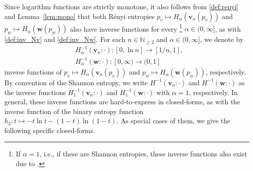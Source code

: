 \documentclass[conference, draftcls, onecolumn]{IEEEtran}
\theoremstyle{plain}
\newcommand{\bvec}[1]{\boldsymbol{#1}}
\newcommand{\lemref}[1]{Lemma~\ref{#1}}
\begin{document}
Since logarithm functions are strictly monotone, it also follows from \eqref{def:renyi} and \lemref{lem:mono} that both R\'{e}nyi entropies $p_{v} \mapsto H_{\alpha}( \bvec{v}_{n}( p_{v} ) )$ and $p_{w} \mapsto H_{\alpha}( \bvec{w}( p_{w} ) )$ also have inverse functions for every%
\footnote{If $\alpha = 1$, i.e., if these are Shannon entropies, these inverse functions also exist due to \cite[Lemma~1]{part1}.}
$\alpha \in (0, \infty]$,
as with \eqref{def:inv_Nv} and \eqref{def:inv_Nw}.
For each $n \in \mathbb{N}_{\ge 2}$ and $\alpha \in (0, \infty]$, we denote by
\begin{align}
&
H_{\alpha}^{-1}( \bvec{v}_{n} : \cdot ) : [0, \ln n] \to [1/n, 1] ,
\label{def:inv_Hv} \\
&
H_{\alpha}^{-1}( \bvec{w} : \cdot ) : [0, \infty) \to (0, 1]
\label{def:inv_Hw}
\end{align}
inverse functions of $p_{v} \mapsto H_{\alpha}( \bvec{v}_{n}( p_{v} ) )$ and $p_{w} \mapsto H_{\alpha}( \bvec{w}( p_{w} ) )$, respectively.
By convention of the Shannon entropy, we write $H^{-1}( \bvec{v}_{n} : \cdot )$ and $H^{-1}( \bvec{w} : \cdot )$ as the inverse functions $H_{1}^{-1}( \bvec{v}_{n} : \cdot )$ and $H_{1}^{-1}( \bvec{w} : \cdot )$ with $\alpha = 1$, respectively.
In general, these inverse functions are hard-to-express in closed-forms, as with the inverse function of the binary entropy function $h_{2} : t \mapsto - t \ln t - (1-t) \ln (1-t)$.
As special cases of them, we give the following specific closed-forms.
\end{document}

